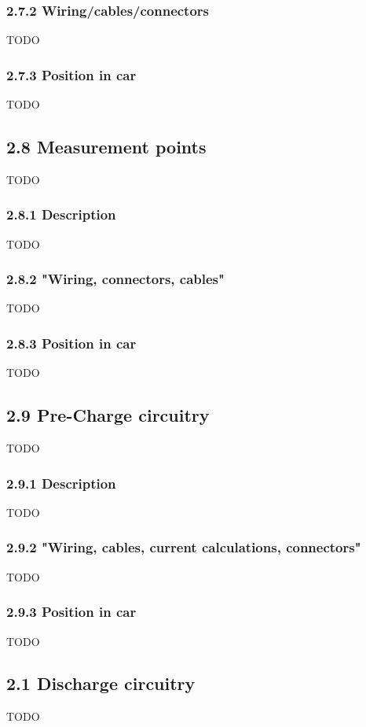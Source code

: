 \documentclass{article}
\begin{document}
\subsubsection*{2.7.2 Wiring/cables/connectors}
TODO

\subsubsection*{2.7.3 Position in car}
TODO

\subsection*{2.8 Measurement points}
TODO

\subsubsection*{2.8.1 Description}
TODO

\subsubsection*{2.8.2 "Wiring, connectors, cables"}
TODO

\subsubsection*{2.8.3 Position in car}
TODO

\subsection*{2.9 Pre-Charge circuitry}
TODO

\subsubsection*{2.9.1 Description}
TODO

\subsubsection*{2.9.2 "Wiring, cables, current calculations, connectors"}
TODO

\subsubsection*{2.9.3 Position in car}
TODO

\subsection*{2.1 Discharge circuitry}
TODO
\end{document}
